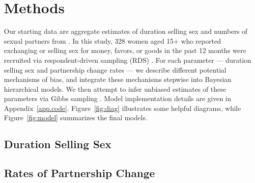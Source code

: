 \section{Methods}\label{meth}
Our starting data are aggregate estimates of
duration selling sex and numbers of sexual partners from \cite{Baral2014}.
In this study, 328 women aged 15+
who reported exchanging or selling sex for money, favors, or goods in the past 12 months
were recruited via respondent-driven sampling (RDS) \cite{Heckathorn1997}.
For each parameter --- duration selling sex and partnership change rates ---
we describe different potential mechanisms of bias,
and integrate these mechanisms stepwise into Bayesian hierarchical models.
We then attempt to infer unbiased estimates of these parameters
via Gibbs sampling \cite{Geman1984}.
Model implementation details are given in Appendix~\ref{app.code}.
Figure~\ref{fig:diag} illustrates some helpful diagrams, while
Figure~\ref{fig:model} summarizes the final models.

\subsection{Duration Selling Sex}\label{meth.yss}


\subsection{Rates of Partnership Change}\label{meth.parts}

